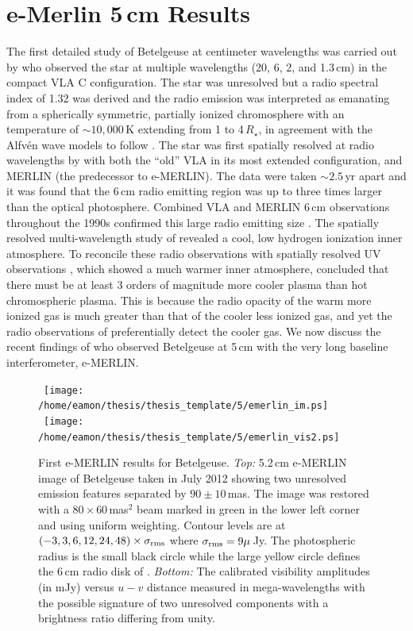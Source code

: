 \section{e-Merlin 5\,cm Results}\label{sec:5.12}
The first detailed study of Betelgeuse at centimeter wavelengths was carried out by \cite{newell_1982}
who observed the star at multiple wavelengths (20, 6, 2, and 1.3\,cm) in the compact VLA C configuration. The star was unresolved but a radio spectral index of 1.32 was derived and the radio emission was interpreted as emanating from a spherically symmetric, partially ionized chromosphere with an temperature of  $\sim 10,000$\,K extending from 1 to 4\,$R_{\star}$, in agreement with the Alfv\'en wave models to follow \citep{hartmann_1984}. The star was first spatially resolved at radio wavelengths by \cite{skinner_1997} with both the ``old'' VLA in its most extended configuration, and MERLIN (the predecessor to e-MERLIN). The data were taken $\sim 2.5$\,yr apart and it was found that the 6\,cm radio emitting region was up to three times larger than the optical photosphere. Combined VLA and MERLIN 6\,cm observations throughout the 1990s confirmed this large radio emitting size \citep{morris_2001}. The spatially resolved multi-wavelength study of \cite{lim_1998} revealed a cool, low hydrogen ionization inner atmosphere. To reconcile these radio observations with spatially resolved UV observations \cite{gilliland_1996}, which showed a much warmer inner atmosphere, \cite{lim_1998} concluded that there must be at least 3 orders of magnitude more cooler plasma than hot chromospheric plasma. This is because the radio opacity of the warm more ionized gas is much greater than that of the cooler less ionized gas, and yet the radio observations of \cite{lim_1998} preferentially detect the cooler gas. We now discuss the recent findings of \cite{richards_2013} who observed Betelgeuse at 5\,cm with the very long baseline interferometer, e-MERLIN.

\begin{figure}[!ht]
\centering 
\mbox{
          \texttt{[image: /home/eamon/thesis/thesis\_template/5/emerlin\_im.ps]}
           }
\mbox{           
          \texttt{[image: /home/eamon/thesis/thesis\_template/5/emerlin\_vis2.ps]}
          }
\caption[First e-MERLIN results for Betelgeuse]{First e-MERLIN results for Betelgeuse. \textit{Top:} 5.2\,cm e-MERLIN image of Betelgeuse taken in July 2012 showing two unresolved emission features separated by $90\pm10$\,mas. The image was restored with a $80\times 60$\,mas$^2$ beam marked in green in the lower left corner and using uniform weighting. Contour levels are at $(-3, 3, 6, 12, 24, 48)\times \sigma _{\rm{rms}}$ where $\sigma _{\rm{rms}} = 9\mu$\,Jy. The photospheric radius is the small black circle while the large yellow circle defines the 6\,cm radio disk of \cite{lim_1998}. \textit{Bottom:} The calibrated visibility amplitudes (in mJy) versus $u-v$ distance measured in mega-wavelengths with the possible signature of two unresolved components with a brightness ratio differing from unity. }
\label{fig:5.13}
\end{figure}

